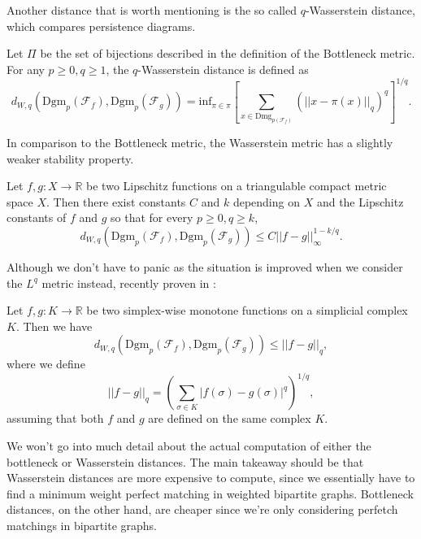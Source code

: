 Another distance that is worth mentioning is the so called $q$-Wasserstein distance, which compares persistence diagrams.

\begin{definition}
  Let $\Pi$ be the set of bijections described in the definition of the Bottleneck metric. For any $p \geq 0, q \geq 1$, the $q$-Wasserstein distance is defined as
  \begin{equation*}
    d_{W,q}(\text{Dgm}_{p}(\mathcal{F}_{f}), \text{Dgm}_{p}(\mathcal{F}_{g})) = \text{inf}_{\pi \in \pi} \left[\sum_{x \in \text{Dmg}_{{p}(\mathcal{F}_{f})}} (||x - \pi(x)||_{q})^{q} \right]^{1/q}.
  \end{equation*}
\end{definition}

In comparison to the Bottleneck metric, the Wasserstein metric has a slightly weaker stability property.

\begin{theorem}
  Let $f,g: X \to \mathbb{R}$ be two Lipschitz functions on a triangulable compact metric space $X$. Then there exist constants $C$ and $k$ depending on $X$ and the Lipschitz constants of $f$ and $g$ so that for every $p \geq 0, q \geq k$,
  \begin{equation*}
    d_{W,q}(\text{Dgm}_{p}(\mathcal{F}_{f}), \text{Dgm}_{p}(\mathcal{F}_{g})) \leq C ||f-g||_{\infty}^{1 - k/q}.
  \end{equation*}
\end{theorem}

Although we don't have to panic as the situation is improved when we consider the $L^{q}$ metric instead, recently proven in \cite{skraba2020wasserstein}:

\begin{theorem}
  Let $f,g: K \to \mathbb{R}$ be two simplex-wise monotone functions on a simplicial complex $K$. Then we have
  \begin{equation*}
    d_{W,q}(\text{Dgm}_{p}(\mathcal{F}_{f}), \text{Dgm}_{p}(\mathcal{F}_{g})) \leq ||f-g||_{q},
  \end{equation*}
  where we define
  \begin{equation*}
    ||f-g||_{q} = (\sum_{\sigma \in K} |f(\sigma) - g(\sigma)|^{q})^{1/q},
  \end{equation*}
  assuming that both $f$ and $g$ are defined on the same complex $K$.
\end{theorem}

We won't go into much detail about the actual computation of either the bottleneck or Wasserstein distances. The main takeaway should be that Wasserstein distances are more expensive to compute, since we essentially have to find a minimum weight perfect matching in weighted bipartite graphs. Bottleneck distances, on the other hand, are cheaper since we're only considering perfetch matchings in bipartite graphs.

